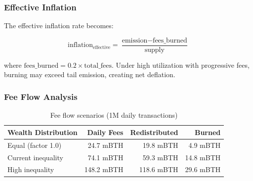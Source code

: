 \subsubsection{Effective Inflation}

The effective inflation rate becomes:

\begin{equation}
\text{inflation}_{\text{effective}} = \frac{\text{emission} - \text{fees\_burned}}{\text{supply}}
\end{equation}

where $\text{fees\_burned} = 0.2 \times \text{total\_fees}$. Under high
utilization with progressive fees, burning may exceed tail emission,
creating net deflation.

\subsubsection{Fee Flow Analysis}

\begin{table}[h]
\centering
\caption{Fee flow scenarios (1M daily transactions)}
\label{tab:fee-flow}
\begin{tabular}{@{}lrrr@{}}
\toprule
\textbf{Wealth Distribution} & \textbf{Daily Fees} & \textbf{Redistributed} & \textbf{Burned} \\
\midrule
Equal (factor 1.0) & 24.7 mBTH & 19.8 mBTH & 4.9 mBTH \\
Current inequality & 74.1 mBTH & 59.3 mBTH & 14.8 mBTH \\
High inequality & 148.2 mBTH & 118.6 mBTH & 29.6 mBTH \\
\bottomrule
\end{tabular}
\end{table}


